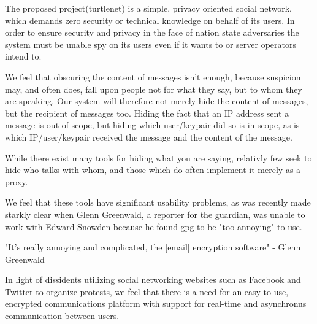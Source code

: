 The proposed project(turtlenet) is a simple, privacy oriented social
network, which demands zero security or technical knowledge on behalf of its
users. In order to ensure security and privacy in the face of nation state
adversaries the system must be unable spy on its users even if it wants to or
server operators intend to.

We feel that obscuring the content of messages isn't enough, because suspicion
may, and often does, fall upon people not for what they say, but to whom they
are speaking. Our system will therefore not merely hide
the content of messages, but the recipient of messages too. Hiding the fact that
an IP address sent a message is out of scope, but hiding which user/keypair did
so is in scope, as is which IP/user/keypair received the message and the content
of the message.

While there exist many tools for hiding what you are saying, relativly few seek
to hide who talks with whom, and those which do often implement it merely as a proxy.

We feel that these tools have significant usability problems, as was recently
made starkly clear when Glenn Greenwald, a reporter for the guardian, was unable
to work with Edward Snowden because he found gpg to be "too annoying" to use.

"It’s really annoying and complicated, the [email] encryption software" - Glenn
Greenwald \cite{greenwald_annoying}

In light of dissidents utilizing social networking websites such as Facebook and
Twitter to organize protests, we feel that there is a need for an easy to use,
encrypted communications platform with support for real-time and asynchronus
communication between users.
